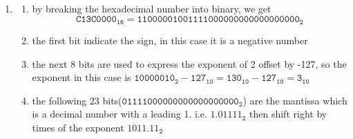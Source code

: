 \documentclass[12pt, a4paper]{article}
\begin{document}
\begin{ans}
    \begin{enumerate}
        \item \begin{enumerate}
                \item by breaking the hexadecimal number into binary, we get $$\mathtt{C13C0000_{16}}=\mathtt{1100 0001 0011 1100 0000 0000 0000 0000_2}$$
                \item the first bit indicate the sign, in this case it is a negative number
                \item the next 8 bits are used to express the exponent of 2 offset by -127, so the exponent in this case is $\mathtt{10000010_2 - 127_{10} = 130_{10} - 127_{10} = 3_{10}}$ 
                \item the following 23 bits($\mathtt{011 1100 0000 0000 0000 0000_2}$) are the mantissa which is a decimal number with a leading 1. i.e. $\mathtt{1.01111_2}$ then shift right by times of the exponent $\mathtt{1011.11_2}$
                        

\end{enumerate}
\end{enumerate}
\end{ans}
\end{document}

